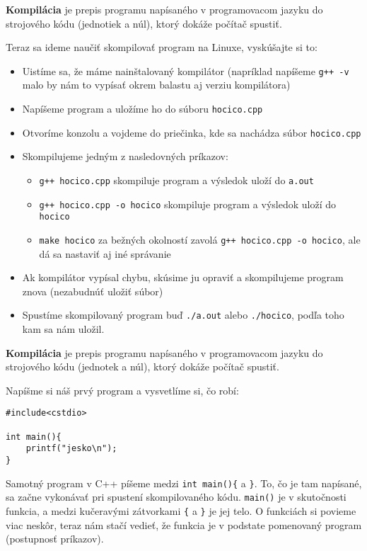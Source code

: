 
\textbf{Kompilácia} je prepis programu napísaného v programovacom jazyku do
strojového kódu (jednotiek a núl), ktorý dokáže počítač spustiť.

Teraz sa ideme naučiť skompilovať program na Linuxe, vyskúšajte si to:
\begin{itemize}
    \item Uistíme sa, že máme nainštalovaný kompilátor 
    (napríklad napíšeme \verb!g++ -v! malo by nám to 
    vypísať okrem balastu aj verziu kompilátora)
    \item Napíšeme program a uložíme ho do súboru \verb!hocico.cpp!
    \item Otvoríme konzolu a vojdeme do priečinka, 
    kde sa nachádza súbor \verb!hocico.cpp!
    \item Skompilujeme jedným z nasledovných príkazov:
    \begin{itemize}
        \item \verb!g++ hocico.cpp! skompiluje program 
        a výsledok uloží do \verb!a.out!
        \item \verb!g++ hocico.cpp -o hocico! skompiluje program 
        a výsledok uloží do \verb!hocico!
        \item \verb!make hocico! za bežných okolností zavolá 
        \verb!g++ hocico.cpp -o hocico!, ale dá sa nastaviť aj iné správanie
    \end{itemize}
    \item Ak kompilátor vypísal chybu, skúsime ju opraviť a skompilujeme
    program znova (nezabudnúť uložiť súbor) 
    \item Spustíme skompilovaný program
    buď \verb!./a.out! alebo \verb!./hocico!, podľa toho kam sa nám uložil.
    
\end{itemize}


\textbf{Kompilácia} je prepis programu napísaného v programovacom jazyku do
strojového kódu (jednotek a núl), ktorý dokáže počítač spustiť.


Napíšme si náš prvý program a vysvetlíme si, čo robí:
\begin{lstlisting}
#include<cstdio>

int main(){
    printf("jesko\n");
}
\end{lstlisting}

Samotný program v C++ píšeme medzi \verb!int main(){! a \verb!}!.  To, čo je
tam napísané, sa začne vykonávať pri spustení skompilovaného kódu.
\verb!main()! je v skutočnosti funkcia, a medzi kučeravými zátvorkami \verb'{'
a \verb'}' je jej telo.  O funkciách si povieme viac neskôr, teraz nám stačí
vedieť, že funkcia je v podstate pomenovaný program (postupnosť príkazov). 

